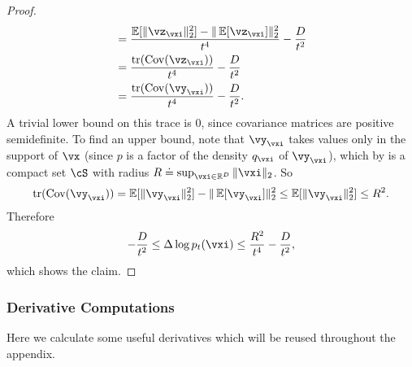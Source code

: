 \documentclass[../../book-main.tex]{subfiles}
\begin{document}
\begin{proof}
\begin{align}
        &= \frac{\Ex[\norm{\vz_{\vxi}}_{2}^{2}] - \norm{\Ex[\vz_{\vxi}]}_{2}^{2}}{t^{4}} - \frac{D}{t^{2}} \\
        &= \frac{\tr(\Cov(\vz_{\vxi}))}{t^{4}} - \frac{D}{t^{2}} \\
        &= \frac{\tr(\Cov(\vy_{\vxi}))}{t^{4}} - \frac{D}{t^{2}}.
    \end{align}
    A trivial lower bound on this trace is \(0\), since covariance matrices are positive semidefinite. To find an upper bound, note that \(\vy_{\vxi}\) takes values only in the support of \(\vx\) (since \(p\) is a factor of the density \(q_{\vxi}\) of \(\vy_{\vxi}\)), which by  is a compact set \(\cS\) with radius \(R \doteq \sup_{\vxi \in \R^{D}}\norm{\vxi}_{2}\). So 
    \begin{equation}
        \tr(\Cov(\vy_{\vxi})) = \Ex[\norm{\vy_{\vxi}}_{2}^{2}] - \norm{\Ex[\vy_{\vxi}]}_{2}^{2} \leq \Ex[\norm{\vy_{\vxi}}_{2}^{2}] \leq R^{2}.
    \end{equation}
    Therefore 
    \begin{equation}
        -\frac{D}{t^{2}} \leq \Delta \log p_{t}(\vxi) \leq \frac{R^{2}}{t^{4}} - \frac{D}{t^{2}},
    \end{equation}
    which shows the claim.
\end{proof}

\subsubsection{Derivative Computations}

Here we calculate some useful derivatives which will be reused throughout the appendix.
\end{document}

